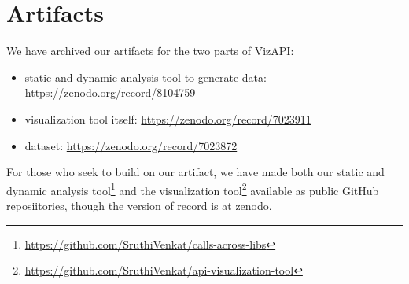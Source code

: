\section{Artifacts}
\label{sec:artifacts}
We have archived our artifacts for the two parts of VizAPI:
\begin{itemize}
\item static and dynamic analysis tool to generate data: \url{https://zenodo.org/record/8104759}
\item visualization tool itself: \url{https://zenodo.org/record/7023911}
\item dataset: \url{https://zenodo.org/record/7023872}
\end{itemize}
For those who seek to build on our artifact, we have made both
our static and dynamic analysis tool\footnote{\url{https://github.com/SruthiVenkat/calls-across-libs}}
and the visualization tool\footnote{\url{https://github.com/SruthiVenkat/api-visualization-tool}}
available as public GitHub reposiitories, though the version of record is at zenodo.
